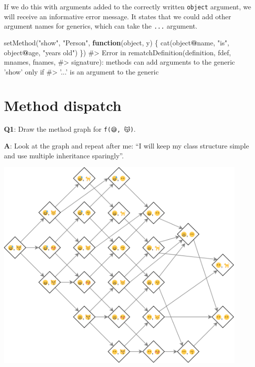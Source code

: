 \documentclass[
]{krantz}
\makeatletter
\newenvironment{Shaded}{\begin{snugshade}}{\end{snugshade}}
\newcommand{\CommentTok}[1]{\textcolor[rgb]{0.56,0.35,0.01}{\textit{#1}}}
\newcommand{\ControlFlowTok}[1]{\textcolor[rgb]{0.13,0.29,0.53}{\textbf{#1}}}
\newcommand{\KeywordTok}[1]{\textcolor[rgb]{0.13,0.29,0.53}{\textbf{#1}}}
\newcommand{\NormalTok}[1]{#1}
\newcommand{\OperatorTok}[1]{\textcolor[rgb]{0.81,0.36,0.00}{\textbf{#1}}}
\newcommand{\StringTok}[1]{\textcolor[rgb]{0.31,0.60,0.02}{#1}}
\newenvironment{kframe}{%
\medskip{}
\setlength{\fboxsep}{.8em}
 \def\at@end@of@kframe{}%
 \ifinner\ifhmode%
  \def\at@end@of@kframe{\end{minipage}}%
  \begin{minipage}{\columnwidth}%
 \fi\fi%
 \def\FrameCommand##1{\hskip\@totalleftmargin \hskip-\fboxsep
 \colorbox{shadecolor}{##1}\hskip-\fboxsep
     \hskip-\linewidth \hskip-\@totalleftmargin \hskip\columnwidth}%
 \MakeFramed {\advance\hsize-\width
   \@totalleftmargin\z@ \linewidth\hsize
   \@setminipage}}%
 {\par\unskip\endMakeFramed%
 \at@end@of@kframe}
\renewenvironment{Shaded}{\begin{kframe}}{\end{kframe}}
\renewcommand{\KeywordTok} [1]{\textcolor[rgb]{0.00,0.44,0.13}{{#1}}}
\renewcommand{\StringTok}  [1]{\textcolor[rgb]{0.25,0.44,0.63}{{#1}}}
\renewcommand{\CommentTok} [1]{\textcolor[rgb]{0.38,0.63,0.69}{{#1}}}
\renewcommand{\NormalTok}  [1]{{#1}}
\makeatother
\begin{document}
If we do this with arguments added to the correctly written \texttt{object} argument, we will receive an informative error message. It states that we could add other argument names for generics, which can take the \texttt{...} argument.

\begin{Shaded}
\begin{Highlighting}[]
\KeywordTok{setMethod}\NormalTok{(}\StringTok{"show"}\NormalTok{, }\StringTok{"Person"}\NormalTok{, }\ControlFlowTok{function}\NormalTok{(object, y) \{}
  \KeywordTok{cat}\NormalTok{(object}\OperatorTok{@}\NormalTok{name, }\StringTok{"is"}\NormalTok{, object}\OperatorTok{@}\NormalTok{age, }\StringTok{"years old"}\NormalTok{)}
\NormalTok{\})}
\CommentTok{#> Error in rematchDefinition(definition, fdef, mnames, fnames,}
\CommentTok{#> signature): methods can add arguments to the generic 'show' only if}
\CommentTok{#> '...' is an argument to the generic}
\end{Highlighting}
\end{Shaded}

\hypertarget{method-dispatch}{%
\section{Method dispatch}\label{method-dispatch}}

\textbf{{Q1}}: Draw the method graph for \texttt{f(😅,\ 😽)}.

\textbf{{A}}: Look at the graph and repeat after me: ``I will keep my class structure simple and use multiple inheritance sparingly''.

\begin{center}\includegraphics[width=350pt]{diagrams/s4/method_dispatch1} \end{center}
\end{document}
